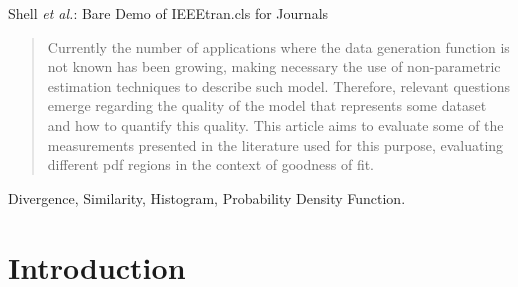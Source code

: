 \documentclass[conference]{IEEEtran}
\begin{document}
%
{Shell \MakeLowercase{\textit{et al.}}: Bare Demo of IEEEtran.cls for Journals}
%








\maketitle


\begin{abstract}
Currently the number of applications where the data generation function is not known has been growing, making necessary the use of non-parametric estimation techniques to describe such model. Therefore, relevant questions emerge regarding the quality of the model that represents some dataset and how to quantify this quality. This article aims to evaluate some of the measurements presented in the literature used for this purpose, evaluating different pdf regions in the context of goodness of fit.
\end{abstract}



\begin{IEEEkeywords}

Divergence, Similarity, Histogram, Probability Density Function.

\end{IEEEkeywords}

\IEEEpeerreviewmaketitle

\section{Introduction}
\end{document}
